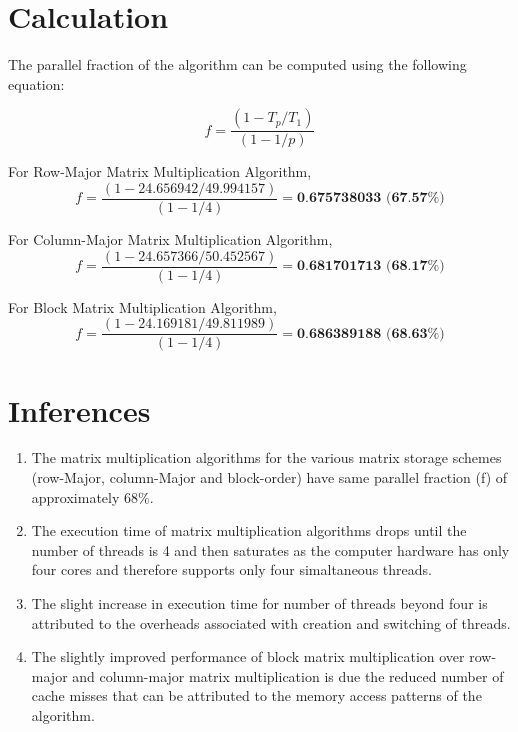 \documentclass{article}
\begin{document}
\section{Calculation}

The parallel fraction of the algorithm can be computed using the following equation:

\begin{equation}
	f = \frac{(1-T_p/T_1)}{(1-1/p)}
\end{equation}

For Row-Major Matrix Multiplication Algorithm, 
\[f = \frac{(1-24.656942/49.994157)}{(1-1/4)} = \textbf{0.675738033 (67.57\%)}\]

For Column-Major Matrix Multiplication Algorithm, 
\[f = \frac{(1-24.657366/50.452567)}{(1-1/4)} = \textbf{0.681701713 (68.17\%)}\]

For Block Matrix Multiplication Algorithm, 
\[f = \frac{(1-24.169181/49.811989)}{(1-1/4)} = \textbf{0.686389188 (68.63\%)}\]

\section{Inferences}

\begin{enumerate}
	\item The matrix multiplication algorithms for the various matrix storage schemes (row-Major, column-Major and block-order) have same parallel fraction (f) of approximately 68\%.
	
	\item The execution time of matrix multiplication algorithms drops until the number of threads is 4 and then saturates as the computer hardware has only four cores and therefore supports only four simaltaneous threads.
	
	\item The slight increase in execution time for number of threads beyond four is attributed to the overheads associated with creation and switching of threads.
	
	\item The slightly improved performance of block matrix multiplication over row-major and column-major matrix multiplication is due the reduced number of cache misses that can be attributed to the memory access patterns of the algorithm.
	
\end{enumerate}
\end{document}
